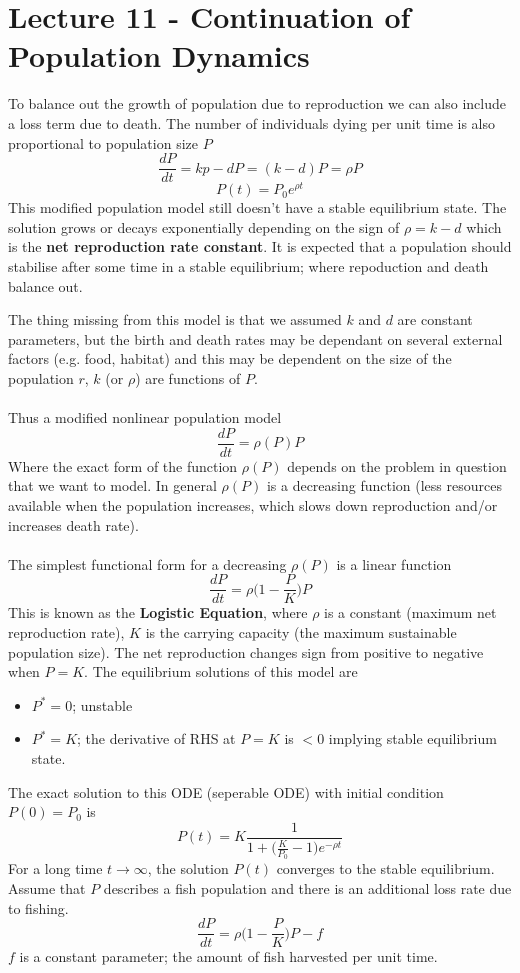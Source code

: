 \documentclass[a6paper]{article}
\theoremstyle{definition}
\theoremstyle{plain}
\theoremstyle{remark}
\begin{document}
\section{Lecture 11 - Continuation of Population Dynamics}
To balance out the growth of population due to reproduction we can also include
a loss term due to death. The number of individuals dying per unit time is also
proportional to population size $ P $
$$ \frac{dP}{dt} = kp - dP = (k-d)P = \rho P$$
$$ P(t) = P_0 e^{\rho t} $$
This modified population model still doesn't have a stable equilibrium state.
The solution grows or decays exponentially depending on the sign of $ \rho
= k - d $ which is the \textbf{net reproduction rate constant}.
It is expected that a population should stabilise after some time in a stable
equilibrium; where repoduction and death balance out.
\par The thing missing from this model is that we assumed $ k $ and $ d $ are
constant parameters, but the birth and death rates may be dependant on several
external factors (e.g. food, habitat) and this may be dependent on the size of
the population $ r $, $ k $ (or $ \rho $) are functions of $ P $. 
\\\\
Thus a modified nonlinear population model
$$ \frac{dP}{dt} = \rho (P) P $$
Where the exact form of the function $ \rho (P) $ depends on the problem in
question that we want to model. In general $ \rho (P) $ is a decreasing
function (less resources available when the population increases, which slows
down reproduction and/or increases death rate).
\\\\
The simplest functional form for a decreasing $ \rho (P) $ is a linear function
$$ \frac{dP}{dt} = \rho \Big (1 - \frac{P}{K} \Big ) P $$
This is known as the \textbf{Logistic Equation}, where $ \rho  $ is a constant
(maximum net reproduction rate), $ K $ is the carrying capacity (the maximum
sustainable population size). The net reproduction changes sign from positive
to negative when $ P = K $. The equilibrium solutions of this model are 
\begin{itemize}
  \item $ P^* = 0 $; unstable
  \item $ P^* = K $; the derivative of RHS at $ P = K $ is $ < 0 $ implying
    stable equilibrium state.
\end{itemize}
The exact solution to this ODE (seperable ODE) with initial condition $ P(0)
= P_0 $ is 
$$ P(t) = K \frac{1}{1+\Big( \frac{K}{P_0} - 1\Big) e^{-\rho t}} $$
For a long time $ t \to \infty $, the solution $ P(t) $ converges to the stable
equilibrium. Assume that $ P $ describes a fish population and there is an
additional loss rate due to fishing.
$$ \frac{dP}{dt} = \rho \Big (1 - \frac{P}{K}\Big ) P - f $$
$ f $ is a constant parameter; the amount of fish harvested per unit time.
\end{document}
